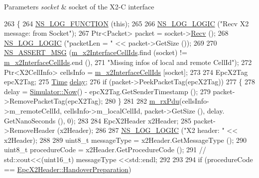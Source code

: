 \begin{DoxyParams}{Parameters}
{\em socket} & socket of the X2-\/C interface \\
\hline
\end{DoxyParams}

\begin{DoxyCode}
263 \{
264   \hyperlink{log-macros-disabled_8h_a90b90d5bad1f39cb1b64923ea94c0761}{NS\_LOG\_FUNCTION} (\textcolor{keyword}{this});
265 
266   \hyperlink{group__logging_ga88acd260151caf2db9c0fc84997f45ce}{NS\_LOG\_LOGIC} (\textcolor{stringliteral}{"Recv X2 message: from Socket"});
267   Ptr<Packet> packet = socket->\hyperlink{classns3_1_1Socket_a8949b1f844aae563446f2f4c5be8827a}{Recv} ();
268   \hyperlink{group__logging_ga88acd260151caf2db9c0fc84997f45ce}{NS\_LOG\_LOGIC} (\textcolor{stringliteral}{"packetLen = "} << packet->GetSize ());
269 
270   \hyperlink{assert_8h_aff5ece9066c74e681e74999856f08539}{NS\_ASSERT\_MSG} (\hyperlink{classns3_1_1EpcX2_ac2a7cd7a712f47a9f429254842762482}{m\_x2InterfaceCellIds}.find (socket) != 
      \hyperlink{classns3_1_1EpcX2_ac2a7cd7a712f47a9f429254842762482}{m\_x2InterfaceCellIds}.end (),
271                  \textcolor{stringliteral}{"Missing infos of local and remote CellId"});
272   Ptr<X2CellInfo> cellsInfo = \hyperlink{classns3_1_1EpcX2_ac2a7cd7a712f47a9f429254842762482}{m\_x2InterfaceCellIds} [socket];
273 
274   EpcX2Tag epcX2Tag;
275   \hyperlink{namespacens3_1_1TracedValueCallback_a7ffd3e7c142ffe7c8a1d2db9b8de38ec}{Time} \hyperlink{lte_2model_2fading-traces_2fading__trace__generator_8m_a7964e6aa8f61a9d28973c8267a606ad8}{delay};
276   \textcolor{keywordflow}{if} (packet->PeekPacketTag(epcX2Tag))
277     \{
278       delay = \hyperlink{classns3_1_1Simulator_ac3178fa975b419f7875e7105be122800}{Simulator::Now}() - epcX2Tag.GetSenderTimestamp ();
279       packet->RemovePacketTag(epcX2Tag);
280     \}
281 
282   \hyperlink{classns3_1_1EpcX2_a00f11080fe6a1d7020bfae006445eb59}{m\_rxPdu}(cellsInfo->m\_remoteCellId, cellsInfo->m\_localCellId, packet->GetSize (), delay.
      GetNanoSeconds (), 0);
283 
284   EpcX2Header x2Header;
285   packet->RemoveHeader (x2Header);
286 
287   \hyperlink{group__logging_ga88acd260151caf2db9c0fc84997f45ce}{NS\_LOG\_LOGIC} (\textcolor{stringliteral}{"X2 header: "} << x2Header);
288 
289   uint8\_t messageType = x2Header.GetMessageType ();
290   uint8\_t procedureCode = x2Header.GetProcedureCode ();
291  \textcolor{comment}{// std::cout<<(uint16\_t) messageType <<std::endl;}
292 
293 
294   \textcolor{keywordflow}{if} (procedureCode == \hyperlink{classns3_1_1EpcX2Header_afd178c1ed3c47948c587955698a15b0da90a8f9de7236863fdfeb02f5580fbe38}{EpcX2Header::HandoverPreparation})

\end{DoxyCode}
